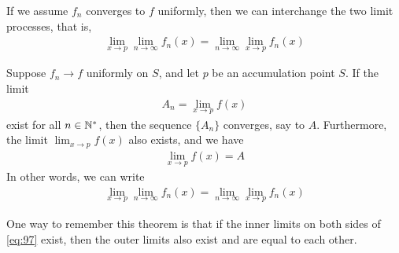 \documentclass[thmcnt=section, 12pt]{my-elegantbook}
\begin{document}

If we assume $f_n$ converges to $f$ uniformly, then we can interchange the two limit processes, that is, 
\begin{align*}
    \lim_{x \to p} \lim_{n \to \infty} f_n(x)
    = \lim_{n \to \infty} \lim_{x \to p} f_n(x)
\end{align*}

\begin{theorem} \label{thm:43}
    Suppose $f_n \to f$ uniformly on $S$, and let $p$ be an accumulation point $S$. If the limit
    \begin{align*}
        A_n = \lim_{x \to p} f(x)
    \end{align*}
    exist for all $n \in \mathbb{N}^\ast$, then the sequence $\{A_n\}$ converges, say to $A$. Furthermore, the limit $\lim_{x \to p}f(x)$ also exists, and we have 
    \begin{align*}
        \lim_{x \to p}f(x) = A
    \end{align*}
    In other words, we can write 
    \begin{align}
        \lim_{x \to p} \lim_{n \to \infty} f_n(x)
        = \lim_{n \to \infty} \lim_{x \to p} f_n(x)
        \label{eq:97}
    \end{align}
\end{theorem}

\begin{note}
    One way to remember this theorem is that if the inner limits on both sides of \eqref{eq:97} exist, then the outer limits also exist and are equal to each other.
\end{note}
\end{document}
